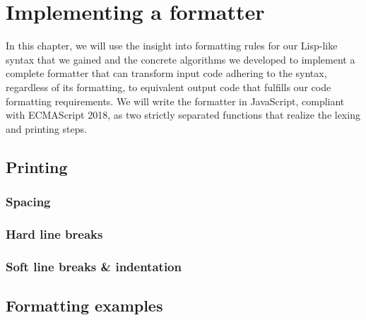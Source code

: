 \chapter{Implementing a formatter}
In this chapter, we will use the insight into formatting rules for our Lisp-like syntax that we gained
and the concrete algorithms we developed to implement a complete formatter that can transform
input code adhering to the syntax, regardless of its formatting, to
equivalent output code that fulfills our code formatting requirements.
We will write the formatter in JavaScript, compliant with ECMAScript 2018,
as two strictly separated functions that realize the lexing and printing steps.



\section{Printing}

\subsection{Spacing}

\subsection{Hard line breaks}

\subsection{Soft line breaks \& indentation}

\section{Formatting examples}
